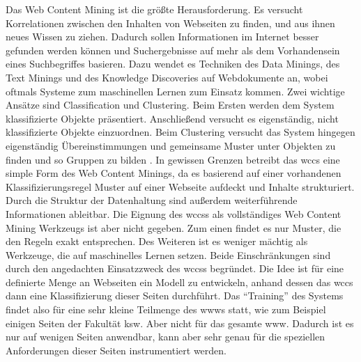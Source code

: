         Das Web Content Mining ist die größte Herausforderung.
        Es versucht Korrelationen zwischen den Inhalten von Webseiten zu finden,
        und aus ihnen neues Wissen zu ziehen.
        Dadurch sollen Informationen im Internet besser gefunden werden können
        und Suchergebnisse auf mehr als dem Vorhandensein eines Suchbegriffes basieren.
        Dazu wendet es Techniken des Data Minings,
        des Text Minings und des Knowledge Discoveries auf Webdokumente an,
        wobei oftmals Systeme zum maschinellen Lernen zum Einsatz kommen.
        Zwei wichtige Ansätze sind Classification und Clustering.
        Beim Ersten werden dem System klassifizierte Objekte präsentiert.
        Anschließend versucht es eigenständig, nicht klassifizierte Objekte einzuordnen.
        Beim Clustering versucht das System hingegen eigenständig
        Übereinstimmungen und gemeinsame Muster unter Objekten zu finden
        und so Gruppen zu bilden
        \cite[Part II]{markov:webMining}.
        In gewissen Grenzen betreibt das \gls{wccs} eine simple Form des Web Content Minings,
        da es basierend auf einer vorhandenen Klassifizierungsregel
        Muster auf einer Webseite aufdeckt und Inhalte strukturiert.
        Durch die Struktur der Datenhaltung sind außerdem weiterführende Informationen ableitbar.
        Die Eignung des \glspl{wccs} als vollständiges Web Content Mining Werkzeugs ist
        aber nicht gegeben.
        Zum einen findet es nur Muster, die den Regeln exakt entsprechen.
        Des Weiteren ist es weniger mächtig als Werkzeuge,
        die auf maschinelles Lernen setzen.
        Beide Einschränkungen sind durch den angedachten Einsatzzweck des \glspl{wccs} begründet.
        Die Idee ist für eine definierte Menge an Webseiten ein Modell zu entwickeln,
        anhand dessen das \gls{wccs} dann eine Klassifizierung dieser Seiten durchführt.
        Das "`Training"' des Systems findet also für eine sehr kleine Teilmenge des \glspl{www} statt,
        wie zum Beispiel einigen Seiten der Fakultät \gls{ksw}.
        Aber nicht für das gesamte \gls{www}.
        Dadurch ist es nur auf wenigen Seiten anwendbar,
        kann aber sehr genau für die speziellen Anforderungen dieser Seiten instrumentiert werden.      

